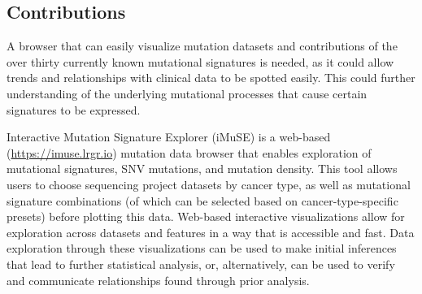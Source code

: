 \documentclass[12pt, letterpaper]{article}
\begin{document}
\subsection{Contributions}
A browser that can easily visualize mutation datasets and contributions of the over thirty currently known mutational signatures is needed, as it could allow trends and relationships with clinical data to be spotted easily.
This could further understanding of the underlying mutational processes that cause certain signatures to be expressed.

Interactive Mutation Signature Explorer (iMuSE) is a web-based (\url{https://imuse.lrgr.io}) mutation data browser that enables exploration of mutational signatures, SNV mutations, and mutation density.
This tool allows users to choose sequencing project datasets by cancer type, as well as mutational signature combinations (of which can be selected based on cancer-type-specific presets) before plotting this data. 
Web-based interactive visualizations allow for exploration across datasets and features in a way that is accessible and fast.
Data exploration through these visualizations can be used to make initial inferences that lead to further statistical analysis, or, alternatively, can be used to verify and communicate relationships found through prior analysis.
\end{document}
